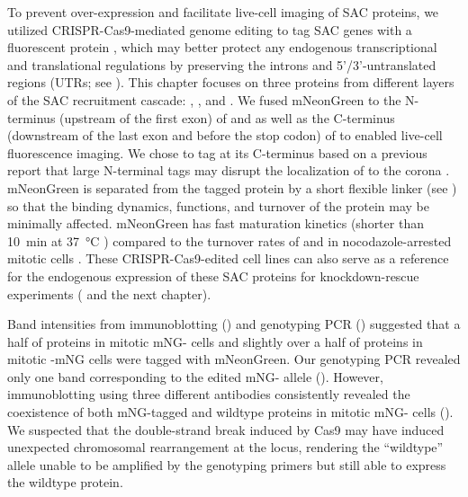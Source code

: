 To prevent over-expression and facilitate live-cell imaging of SAC proteins, we utilized CRISPR-Cas9-mediated genome editing to tag SAC genes with a fluorescent protein  \cite{CRISPRProtocol, Atlas}, which may better protect any endogenous transcriptional and translational regulations by preserving the introns and 5'/3'-untranslated regions (UTRs; see ). This chapter focuses on three proteins from different layers of the SAC recruitment cascade: , , and . We fused mNeonGreen to the N-terminus (upstream of the first exon) of  and  as well as the C-terminus (downstream of the last exon and before the stop codon) of  to enabled live-cell fluorescence imaging. We chose to tag  at its C-terminus based on a previous report that large N-terminal tags may disrupt the localization of  to the corona \cite{CoronaActivatesSAC}. mNeonGreen is separated from the tagged protein by a short flexible linker (see ) so that the binding dynamics, functions, and turnover of the protein may be minimally affected. mNeonGreen has fast maturation kinetics (shorter than \SI{10}{min} at \SI{37}{\celsius} \cite{mNG}) compared to the turnover rates of  and  in nocodazole-arrested mitotic cells \cite{BubR1MitosisTurnover, Bub1MitosisTurnover}. These CRISPR-Cas9-edited cell lines can also serve as a reference for the endogenous expression of these SAC proteins for knockdown-rescue experiments ( and the next chapter).

Band intensities from immunoblotting () and genotyping PCR () suggested that a half of  proteins in mitotic mNG- cells and slightly over a half of  proteins in mitotic -mNG cells were tagged with mNeonGreen. Our genotyping PCR revealed only one band corresponding to the edited mNG- allele (). However, immunoblotting using three different antibodies consistently revealed the coexistence of both mNG-tagged and wildtype  proteins in mitotic mNG- cells (). We suspected that the double-strand break induced by Cas9 may have induced unexpected chromosomal rearrangement at the  locus, rendering the ``wildtype'' allele unable to be amplified by the genotyping primers but still able to express the wildtype  protein.


